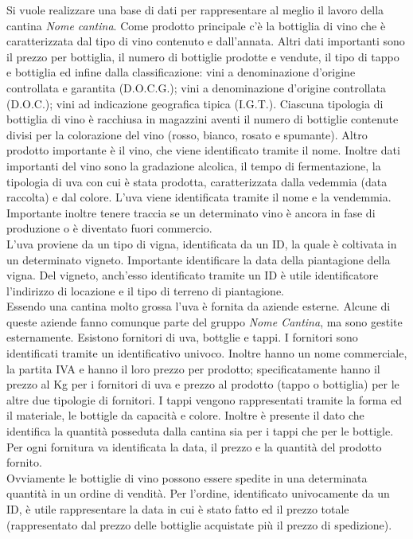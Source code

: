 Si vuole realizzare una base di dati per rappresentare al meglio il lavoro della cantina \emph{Nome cantina}. Come prodotto principale c'è la bottiglia di vino che è caratterizzata dal tipo di vino contenuto e dall'annata. Altri dati importanti sono il prezzo per bottiglia, il numero di bottiglie prodotte e vendute, il tipo di tappo e bottiglia ed infine dalla classificazione: vini a denominazione d'origine controllata e garantita (D.O.C.G.); vini a denominazione d'origine controllata (D.O.C.); vini ad indicazione geografica tipica (I.G.T.). Ciascuna tipologia di bottiglia di vino è racchiusa in magazzini aventi il numero di bottiglie contenute divisi per la colorazione del vino (rosso, bianco, rosato e spumante).
Altro prodotto importante è il vino, che viene identificato tramite il nome. Inoltre dati importanti del vino sono la gradazione alcolica, il tempo di fermentazione, la tipologia di uva con cui è stata prodotta, caratterizzata dalla vedemmia (data raccolta) e dal colore. L'uva viene identificata tramite il nome e la vendemmia. Importante inoltre tenere traccia se un determinato vino è ancora in fase di produzione o è diventato fuori commercio.\\
L'uva proviene da un tipo di vigna, identificata da un ID, la quale è coltivata in un determinato vigneto. Importante identificare la data della piantagione della vigna. Del vigneto, anch'esso identificato tramite un ID è utile identificatore l'indirizzo di locazione e il tipo di terreno di piantagione.\\
Essendo una cantina molto grossa l'uva è fornita da aziende esterne. Alcune di queste aziende fanno comunque parte del gruppo \emph{Nome Cantina}, ma sono gestite esternamente. Esistono fornitori di uva, bottglie e tappi.
I fornitori sono identificati tramite un identificativo univoco. Inoltre hanno un nome commerciale, la partita IVA e hanno il loro prezzo per prodotto; specificatamente hanno il prezzo al Kg per i fornitori di uva e prezzo al prodotto (tappo o bottiglia) per le altre due tipologie di fornitori.
I tappi vengono rappresentati tramite la forma ed il materiale, le bottigle da capacità e colore. Inoltre è presente il dato che identifica la quantità posseduta dalla cantina sia per i tappi che per le bottigle. Per ogni fornitura va identificata la data, il prezzo e la quantità del prodotto fornito.\\
Ovviamente le bottiglie di vino possono essere spedite in una determinata quantità in un ordine di vendità. Per l'ordine, identificato univocamente da un ID, è utile rappresentare la data in cui è stato fatto ed il prezzo totale (rappresentato dal prezzo delle bottiglie acquistate più il prezzo di spedizione).\\
